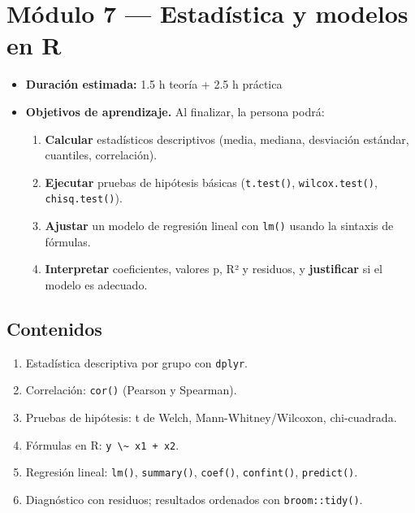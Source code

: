 \chapter{Módulo 7 --- Estadística y modelos en R}

\begin{itemize}
\tightlist
\item
  \textbf{Duración estimada:} 1.5 h teoría + 2.5 h práctica
\item
  \textbf{Objetivos de aprendizaje.} Al finalizar, la persona podrá:

  \begin{enumerate}
  \def\labelenumi{\arabic{enumi}.}
  \tightlist
  \item
    \textbf{Calcular} estadísticos descriptivos (media, mediana,
    desviación estándar, cuantiles, correlación).
  \item
    \textbf{Ejecutar} pruebas de hipótesis básicas
    (\passthrough{\lstinline!t.test()!},
    \passthrough{\lstinline!wilcox.test()!},
    \passthrough{\lstinline!chisq.test()!}).
  \item
    \textbf{Ajustar} un modelo de regresión lineal con
    \passthrough{\lstinline!lm()!} usando la sintaxis de fórmulas.
  \item
    \textbf{Interpretar} coeficientes, valores p, R² y residuos, y
    \textbf{justificar} si el modelo es adecuado.
  \end{enumerate}
\end{itemize}

\section{Contenidos}

\begin{enumerate}
\def\labelenumi{\arabic{enumi}.}
\tightlist
\item
  Estadística descriptiva por grupo con \passthrough{\lstinline!dplyr!}.
\item
  Correlación: \passthrough{\lstinline!cor()!} (Pearson y Spearman).
\item
  Pruebas de hipótesis: t de Welch, Mann-Whitney/Wilcoxon, chi-cuadrada.
\item
  Fórmulas en R: \passthrough{\lstinline!y \~ x1 + x2!}.
\item
  Regresión lineal: \passthrough{\lstinline!lm()!},
  \passthrough{\lstinline!summary()!}, \passthrough{\lstinline!coef()!},
  \passthrough{\lstinline!confint()!},
  \passthrough{\lstinline!predict()!}.
\item
  Diagnóstico con residuos; resultados ordenados con
  \passthrough{\lstinline!broom::tidy()!}.
\end{enumerate}

